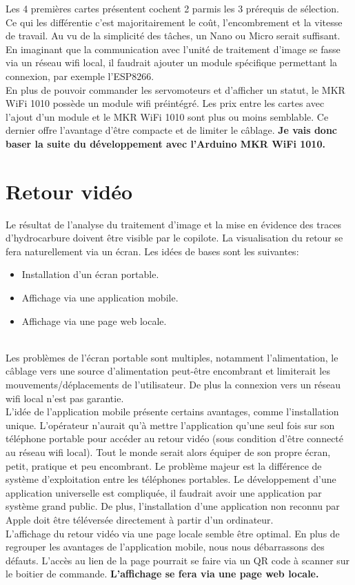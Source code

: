 Les 4 premières cartes présentent cochent 2 parmis les 3 prérequis de sélection. Ce qui les différentie c'est majoritairement le coût, l'encombrement et la vitesse de travail.
Au vu de la simplicité des tâches, un Nano ou Micro serait suffisant. En imaginant que la communication avec l'unité de traitement d'image se fasse via un réseau \Gls{wifi} local,
il faudrait ajouter un module spécifique permettant la connexion, par exemple l'ESP8266.\\
En plus de pouvoir commander les servomoteurs et d'afficher un statut, le MKR WiFi 1010 possède un module \Gls{wifi} préintégré.
Les prix entre les cartes avec l'ajout d'un module et le MKR WiFi 1010 sont plus ou moins semblable. Ce dernier offre l'avantage d'être compacte et de limiter le câblage.
\textbf{Je vais donc baser la suite du développement avec l'Arduino MKR WiFi 1010.} \cite{MKR}
\section{Retour vidéo}
Le résultat de l'analyse du traitement d'image et la mise en évidence des traces d'hydrocarbure doivent être visible par le copilote.
La visualisation du retour se fera naturellement via un écran. Les idées de bases sont les suivantes:
\begin{itemize}
    \item Installation d'un écran portable.
    \item Affichage via une application mobile.
    \item Affichage via une page web locale.
\end{itemize}
\\
Les problèmes de l'écran portable sont multiples, notamment l'alimentation, le câblage vers une source d'alimentation peut-être encombrant
et limiterait les mouvements/déplacements de l'utilisateur. De plus la connexion vers un réseau \Gls{wifi} local n'est pas garantie.\\
L'idée de l'application mobile présente certains avantages, comme l'installation unique. L'opérateur n'aurait qu'à mettre l'application
qu'une seul fois sur son téléphone portable pour accéder au retour vidéo (sous condition d'être connecté au réseau \Gls{wifi} local).
Tout le monde serait alors équiper de son propre écran, petit, pratique et peu encombrant. Le problème majeur est la différence de système d'exploitation
entre les téléphones portables. Le développement d'une application universelle est compliquée, il faudrait avoir une application par système grand public.
De plus, l'installation d'une application non reconnu par Apple doit être téléversée directement à partir d'un ordinateur.\\
L'affichage du retour vidéo via une page locale semble être optimal. En plus de regrouper les avantages de l'application mobile, nous nous débarrassons des défauts.
L'accès au lien de la page pourrait se faire via un QR code à scanner sur le boitier de commande.
\textbf{L'affichage se fera via une page web locale.}

